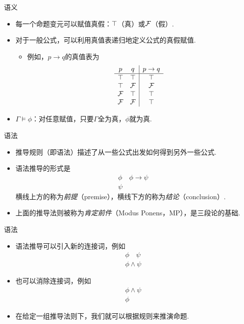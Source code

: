 {语义}
\begin{itemize}
    \item 每一个命题变元可以赋值真假：$\top$（真）或$\mathcal{F}$（假）.
    \item 对于一般公式，可以利用真值表递归地定义公式的真假赋值.
    \begin{itemize}
        \item 例如，$p\to q$的真值表为
        \[\begin{array}{cc|c}
        p&q&p\to q\\\hline
             \top&\top&\top  \\
             \top&\mathcal{F}&\mathcal{F}  \\
             \mathcal{F}&\top&\top  \\
             \mathcal{F}&\mathcal{F}&\top  \\
        \end{array}\]
    \end{itemize}
    \item $\Gamma\models\phi$：对任意赋值，只要$\Gamma$全为真，$\phi$就为真.
\end{itemize}


{语法}
\begin{itemize}
    \item 推导规则（即语法）描述了从一些公式出发如何得到另外一些公式.
    \item 语法推导的形式是
    \[\begin{array}{c}
         \phi\quad\phi\to\psi  \\\hline
         \psi
    \end{array}\]
    横线上方的称为\emph{前提}（premise），横线下方的称为\emph{结论}（conclusion）.
    \item 上面的推导法则被称为\emph{肯定前件}（Modus Ponens，MP），是三段论的基础.
\end{itemize}


{语法}
\begin{itemize}
    \item 语法推导可以引入新的连接词，例如
    \[\begin{array}{c}
         \phi\quad\psi  \\\hline
         \phi\wedge\psi
    \end{array}\]
    \item 也可以消除连接词，例如
    \[\begin{array}{c}
         \phi\wedge\psi  \\\hline
         \phi
    \end{array}\]
    \item 在给定一组推导法则下，我们就可以根据规则来推演命题.
\end{itemize}


